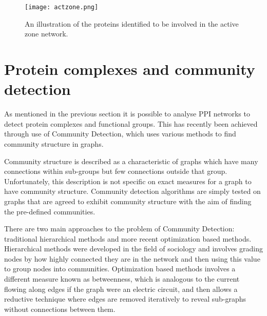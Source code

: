 \begin{figure}
    \centering
    \texttt{[image: actzone.png]}
    \caption{An illustration of the proteins identified to be involved in the active zone network\autocite{chua_architecture_2010}.}
    \label{fig:actzone}
\end{figure}


\section{Protein complexes and community detection}

As mentioned in the previous section it is possible to analyse PPI networks to detect protein complexes and functional groups. %
This has recently been achieved through use of Community Detection\autocites{chen_identifying_2013,wang_recent_2010}, which uses various methods to find community structure in graphs.

Community structure is described as a characteristic of graphs which have many connections within sub-groups but few connections outside that group\autocite{newman_communities_2012}.
Unfortunately, this description is not specific on exact measures for a graph to have community structure. %
Community detection algorithms are simply tested on graphs that are agreed to exhibit community structure with the aim of finding the pre-defined communities. %

There are two main approaches to the problem of Community Detection: traditional hierarchical methods and more recent optimization based methods\autocite{newman_communities_2012}.
Hierarchical methods were developed in the field of sociology and involves grading nodes by how highly connected they are in the network and then using this value to group nodes into communities.
Optimization based methods involves a different measure known as betweenness, which is analogous to the current flowing along edges if the graph were an electric circuit, and then allows a reductive technique where edges are removed iteratively to reveal sub-graphs without connections between them. %

